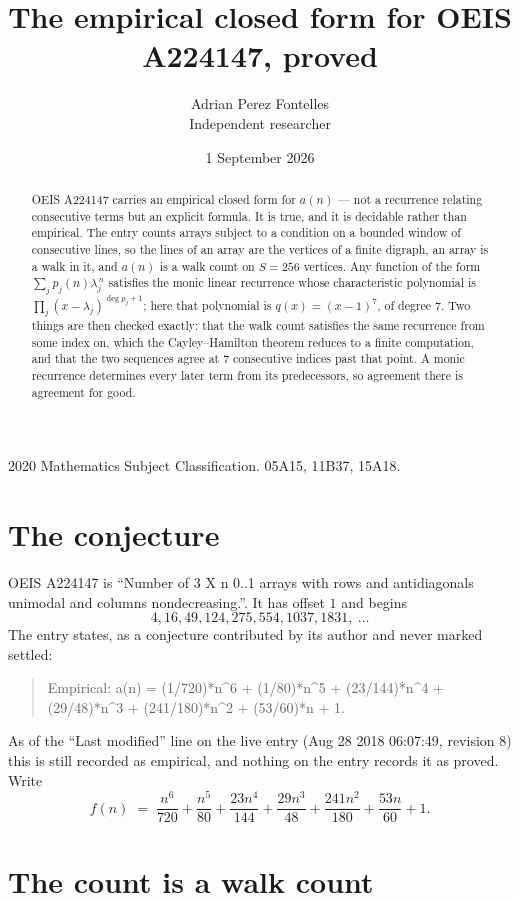\documentclass[11pt,a4paper]{article}
\title{The empirical closed form for OEIS A224147, proved}
\author{Adrian Perez Fontelles\\ \small Independent researcher}
\date{1 September 2026}
\theoremstyle{plain}
\theoremstyle{definition}
\begin{document}
\maketitle

\begin{abstract}
OEIS A224147 carries an empirical closed form for $a(n)$ --- not a recurrence relating
consecutive terms but an explicit formula. It is true, and it is decidable rather than
empirical. The entry counts arrays subject to a condition on a bounded window of consecutive lines, so the lines of an array are the
vertices of a finite digraph, an array is a walk in it, and $a(n)$ is a walk count on
$S=256$ vertices. Any function of the form $\sum_j p_j(n)\lambda_j^{\,n}$ satisfies the
monic linear recurrence whose characteristic polynomial is
$\prod_j(x-\lambda_j)^{\deg p_j+1}$; here that polynomial is $q(x)=(x-1)^{7}$, of degree
$7$. Two things are then checked exactly: that the walk count satisfies the same
recurrence from some index on, which the Cayley--Hamilton theorem reduces to a finite
computation, and that the two sequences agree at $7$ consecutive indices past that
point. A monic recurrence determines every later term from its predecessors, so agreement
there is agreement for good.
\end{abstract}

\noindent\small 2020 Mathematics Subject Classification. 05A15, 11B37, 15A18.\normalsize

\section{The conjecture}

OEIS A224147 is ``Number of 3 X n 0..1 arrays with rows and antidiagonals unimodal and columns nondecreasing.''. It has offset $1$ and begins
\[
4, 16, 49, 124, 275, 554, 1037, 1831,\ \dots
\]
The entry states, as a conjecture contributed by its author and never marked settled:
\begin{quote}
Empirical: a(n) = (1/720)*n\^{}6 + (1/80)*n\^{}5 + (23/144)*n\^{}4 + (29/48)*n\^{}3 + (241/180)*n\^{}2 + (53/60)*n + 1.
\end{quote}
As of the ``Last modified'' line on the live entry (Aug 28 2018 06:07:49, revision 8) this is still
recorded as empirical, and nothing on the entry records it as proved. Write
\[
f(n)\;=\;\frac{n^{6}}{720} + \frac{n^{5}}{80} + \frac{23 n^{4}}{144} + \frac{29 n^{3}}{48} + \frac{241 n^{2}}{180} + \frac{53 n}{60} + 1.
\]

\section{The count is a walk count}
\end{document}
